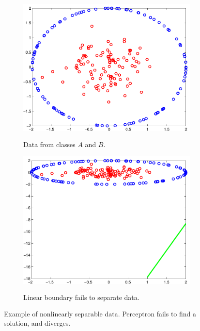 \documentclass[letterpaper,12pt,peerreviewca,draftcls]{IEEEtran}
\begin{document}
\begin{figure}
\centering
	\begin{subfigure}[t]{0.35\textwidth}
		\includegraphics[width=\linewidth]{"Figure S4a.pdf"}
		\label{fig:nlinsep_data}
		\caption{Data from classes $A$ and $B$.}
	\end{subfigure}
    	\begin{subfigure}[t]{0.35\textwidth}
		\includegraphics[width=\linewidth]{"Figure S4b.pdf"}
		\label{fig:nlin_sep_bound}
		\caption{Linear boundary fails to separate data.}
	\end{subfigure}
    \caption{Example of nonlinearly separable data. Perceptron fails to find a solution, and diverges.}
    \label{fig:nlinsep}
\end{figure} 
\end{document}
